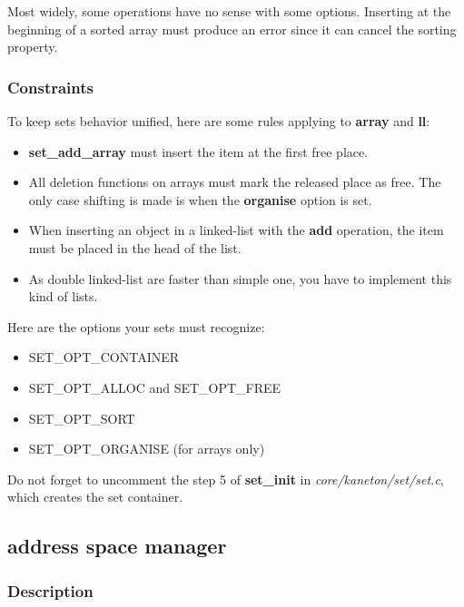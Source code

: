Most   widely,    some   operations   have   no    sense   with   some
options. Inserting at the beginning  of a sorted array must produce an
error since it can cancel the sorting property.

\subsubsection{Constraints}

To  keep  sets behavior  unified,  here  are  some rules  applying  to
\textbf{array} and \textbf{ll}:

\begin{itemize}

\item \textbf{set\_add\_array} must insert the item at the first free place.

\item All deletion functions on arrays must mark the released place as
free. The only case shifting is made is when the \textbf{organise} option
is set.

\item When inserting an object in a linked-list with the \textbf{add}
operation, the item must be placed in the head of the list.

\item As double linked-list are faster than simple one, you have to
implement this kind of lists.

\end{itemize}

Here are the options your sets must recognize:

\begin{itemize}
\item SET\_OPT\_CONTAINER
\item SET\_OPT\_ALLOC and SET\_OPT\_FREE
\item SET\_OPT\_SORT
\item SET\_OPT\_ORGANISE (for arrays only)
\end{itemize}

Do  not  forget to  uncomment  the  step  5 of  \textbf{set\_init}  in
\textit{core/kaneton/set/set.c}, which creates the set container.

%
%

\subsection{address space manager}

\subsubsection{Description}

